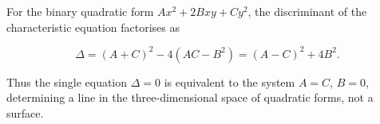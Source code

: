 For the binary quadratic form $Ax^2 + 2Bxy + Cy^2$, the discriminant of the characteristic equation factorises as

$$\Delta = (A + C)^2 - 4(AC - B^2) = (A - C)^2 + 4B^2.$$

Thus the single equation $\Delta = 0$ is equivalent to the system $A = C$, $B = 0$, determining a line in the three-dimensional space of quadratic forms, not a surface.
